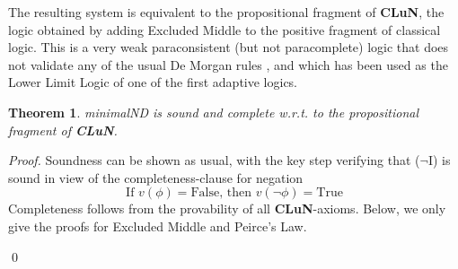 \documentclass[]{article}
\newtheorem{theorem}{Theorem}
\newcommand{\TurnOne}[2]
    { {#1}\vdash_{\textbf{\sf 1}}  {#2}}
\newcommand{\TurnTwo}[2]
    { {#1}\vdash_{\textbf{\sf 2}}  {#2}}
\newcommand{\TurnThree}[2]
    { {#1}\vdash_{\textbf{\sf 3}}  {#2}}
\newcommand{\TurnFour}[2]
    { {#1}\vdash_{\textbf{\sf 4}}  {#2}}
\newcommand{\TurnFive}[2]
    { {#1}\vdash_{\textbf{\sf 5}}  {#2}}
\newcommand{\TurnSix}[2]
    { {#1}\vdash_{\textbf{\sf 6}}  {#2}}
\newcommand{\TurnSeven}[2]
    { {#1}\vdash_{\textbf{\sf 7}}  {#2}}
\begin{document}
The resulting system is equivalent to the propositional fragment of \textbf{CLuN}, the logic obtained by adding Excluded Middle to the positive fragment of classical logic. This is a very weak paraconsistent (but not paracomplete) logic that does not validate any of the usual De Morgan rules \cite{Batens:LogiqueAnalyse:1980}, and which has been used as the Lower Limit Logic of one of the first adaptive logics.

\begin{theorem}\label{thm:clun}
    {\sf minimalND} is sound and complete w.r.t. to the propositional fragment of \textbf{CLuN}.
\end{theorem}
\noindent\textsl{Proof.} Soundness can be shown as usual, with the key step verifying that ($\neg$I) is sound in view of the completeness-clause for negation
\[
   \text{If } v(\phi) = \mathrm{False} \text{, then } v(\neg \phi) = \mathrm{True}\tag{C$\neg$}\label{eq:negclause}
\]
Completeness follows from the provability of all \textbf{CLuN}-axioms. Below, we only give the proofs for Excluded Middle and Peirce's Law.
\qed
\end{document}
